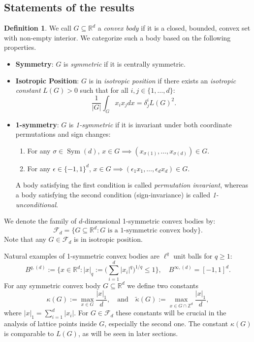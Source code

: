 \documentclass[a4paper,oneside, reqno]{amsart}
\numberwithin{equation}{section}
\theoremstyle{definition}%
\theoremstyle{definition}
\newtheorem{Defn}[Thm]{Definition}
\theoremstyle{definition}%
\theoremstyle{definition}
\newcommand{\Z}{\mathbb{Z}}
\newcommand{\R}{\mathbb{R}}
\DeclareMathOperator{\Sym}{Sym}
\begin{document}
\subsection{Statements of the results}
\begin{Defn}
We call $G \subseteq \R^d$ a \textit{convex body} if it is a closed, bounded, convex set with non-empty interior. We categorize such a body based on the following properties.
\begin{itemize}
    \item \textbf{Symmetry}: $G$ is \textit{symmetric} if it is centrally symmetric.
    \item \textbf{Isotropic Position}: $G$ is in \textit{isotropic position} if there exists an \textit{isotropic constant} $L(G) > 0$ such that for all $i, j \in \{1, \ldots, d\}$:$$\frac{1}{|G|} \int_G x_i x_j dx = \delta^i_j L(G)^2.$$
    \item \textbf{1-symmetry}: $G$ is \textit{1-symmetric} if it is invariant under both coordinate permutations and sign changes:
     \begin{enumerate}
        \item For any $\sigma \in \Sym(d)$, $x \in G \implies (x_{\sigma(1)}, \ldots, x_{\sigma(d)}) \in G$.
        \item For any $\epsilon \in \{-1, 1\}^d$, $x \in G \implies (\epsilon_1 x_1, \ldots, \epsilon_d x_d) \in G$.
    \end{enumerate} A body satisfying the first condition is called \textit{permutation invariant}, whereas a body satisfying the second condition (sign-invariance) is called \textit{1-unconditional}.
\end{itemize}
 We denote the family of $d$-dimensional 1-symmetric convex bodies by:$$\mathcal{F}_d = \{ G \subseteq \mathbb{R}^d : G \text{ is a 1-symmetric convex body} \}.$$
Note that any $G \in \mathcal{F}_d$ is in isotropic position. 
\end{Defn}
Natural examples of 1-symmetric convex bodies are $\ell^q$ unit balls for $q \ge 1$:
\[
B^{q,(d)}:= \Big\{x \in \R^d: |x|_q:= \Big( \sum_{i=1}^d |x_i|^q \Big)^{1/q} \le 1 \Big\}, \quad
B^{\infty,(d)}=[-1,1]^d.
\]
For any symmetric convex body $G \subseteq \R^d$ we define two constants
\[
\kappa(G):= \max_{x \in G} \frac{|x|_1}{d}, \quad \text{and} \quad\widetilde{\kappa}(G):=\max_{x \in G \cap \Z^d} \frac{|x|_1}{d},
\]
where $|x|_1= \sum_{i=1}^d |x_i|$.
For $G \in \mathcal{F}_d$ these constants will be crucial in the analysis of lattice points inside $G$, especially the second one. The constant $\kappa(G)$ is comparable to $L(G)$, as will be seen in later sections.
\end{document}
